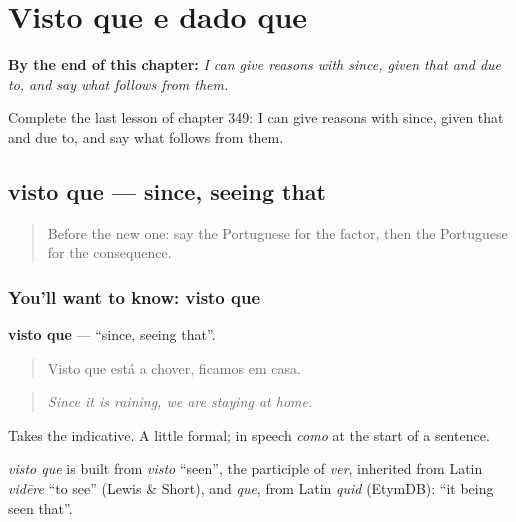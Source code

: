 
\chapter{Visto que e dado que}
\label{ch:pt-visto-que-e-dado-que}

\begin{chapteropening}
\textbf{By the end of this chapter:} \emph{I can give reasons with since, given that and due to, and say what follows from them.}

Complete the last lesson of chapter 349: I can give reasons with since, given that and due to, and say what follows from them.
\end{chapteropening}

\section[visto que]{visto que — since, seeing that}

\label{lesson:PT-C349-visto-que}



\begin{quote}
Before the new one: say the Portuguese for the factor, then the Portuguese for the consequence.
\end{quote}

\subsection*{You'll want to know: visto que}
\textbf{visto que} — \textquotedblleft{}since, seeing that\textquotedblright{}.

\begin{quote}
Visto que está a chover, ficamos em casa.
\end{quote}

\begin{quote}
\emph{Since it is raining, we are staying at home.}
\end{quote}

Takes the indicative. A little formal; in speech \emph{como} at the start of a sentence.

\begin{cousinweb}
\emph{visto que} is built from \emph{visto} \textquotedblleft{}seen\textquotedblright{}, the participle of \emph{ver}, inherited from Latin \emph{vidēre} \textquotedblleft{}to see\textquotedblright{} (Lewis \& Short), and \emph{que}, from Latin \emph{quid} (EtymDB): \textquotedblleft{}it being seen that\textquotedblright{}.
\end{cousinweb}

